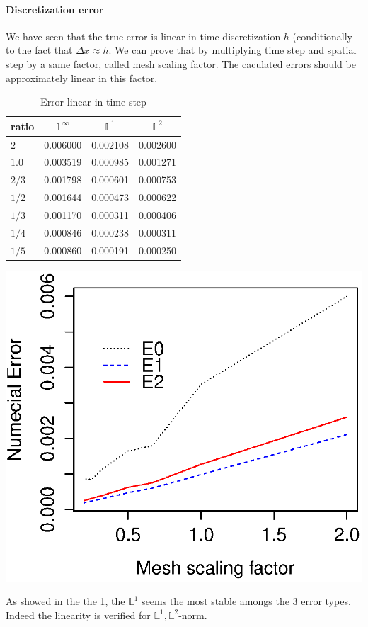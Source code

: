 \documentclass[a4paper,10pt]{article}
\begin{document}
\paragraph{Discretization error}
We have seen that the true error is linear in time discretization $h$ (conditionally to the fact that $\Delta x \approx h$. We can prove that by multiplying time step and spatial step by a same factor, called mesh scaling factor. The caculated errors should be approximately linear in this factor. 
\begin{table}[ht]
\centering 
\parbox{0.4\textwidth}{
\begin{tabular}{l|c|c|c}
ratio & $\mathbb{L}^{\infty}$ & $\mathbb{L}^{1}$ & $\mathbb{L}^{2}$  \\
\hline \hline
$2$    & 0.006000& 0.002108& 0.002600\\
$1.0$  & 0.003519& 0.000985& 0.001271\\
$2/3$  & 0.001798& 0.000601& 0.000753\\
$1/2$  & 0.001644& 0.000473& 0.000622\\
$1/3$  & 0.001170& 0.000311& 0.000406\\
$1/4$  & 0.000846& 0.000238& 0.000311\\
$1/5$  & 0.000860& 0.000191& 0.000250
\end{tabular}
}
\hspace{0.3cm}
\begin{minipage}[c]{0.53\textwidth}%
\hspace{0.5cm}
\includegraphics[scale=0.5,keepaspectratio=true]{linear_error}
\end{minipage}
\caption{Error linear in time step}
\label{table:error_linear}
\end{table}
As showed in the the \ref{table:error_linear}, the $\mathbb{L}^1$ seems the most stable amongs the 3 error types. Indeed the linearity is verified for $\mathbb{L}^1,\mathbb{L}^2$-norm.
\end{document}
